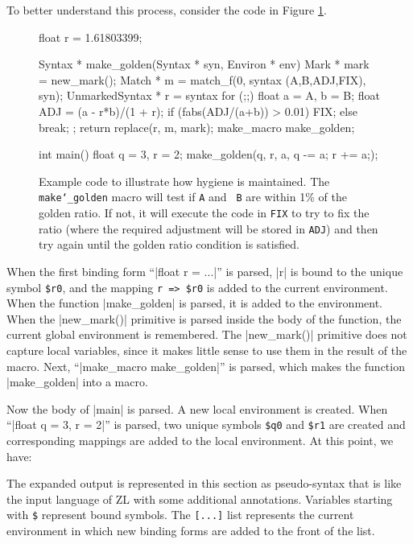 To better understand this process, consider the code in Figure
\ref{hygiene-fig}.  
\begin{figure}
\begin{codef}
float r = 1.61803399;

Syntax * make_golden(Syntax * syn, Environ * env) { 
  Mark * mark = new_mark(); 
  Match * m = match_f(0, syntax (A,B,ADJ,FIX), syn); 
  UnmarkedSyntax * r = syntax { 
    for (;;) { float a = A, b = B; 
               float ADJ = (a - r*b)/(1 + r); 
               if (fabs(ADJ/(a+b)) > 0.01) FIX; 
               else break; } 
  }; 
  return replace(r, m, mark); 
} 
make_macro make_golden; 

int main() {
  float q = 3, r = 2;
  make_golden(q, r, a, {q -= a; r += a;});
}
\end{codef}
\caption[Example code to illustrate how hygiene is maintained.]%
{Example code to illustrate how hygiene is maintained.
  The {\tt make\char`\_golden} macro will test if {\tt A} and {\tt
    B} are within 1\% of the golden ratio.  If not, it will execute
  the code in {\tt FIX} to try to fix the ratio (where the required
  adjustment will be stored in {\tt ADJ}) and then try again until the 
  golden ratio condition is satisfied.}
\label{hygiene-fig}
\end{figure}
When the first binding form ``|float r = ...|'' is
parsed, |r| is bound to the unique symbol \verb/$r0/, and the mapping
\verb/r => $r0/ is added to the current environment.  When the
function |make_golden| is parsed, it is added to the environment.
When the |new_mark()| primitive is parsed inside the body of the
function, the current global environment is remembered.  The
|new_mark()| primitive does not capture local variables, since it
makes little sense to use them in the result of the macro.  Next,
``|make_macro make_golden|'' is parsed, which makes the function
|make_golden| into a macro.

Now the body of |main| is parsed.  A new local environment is
created.  When ``|float q = 3, r = 2|'' is parsed, two unique symbols
\verb/$q0/ and \verb/$r1/ are created and corresponding mappings are
added to the local environment.  At this point, we have:
The expanded output is represented in this section as
pseudo-syntax that is like the input language of ZL with some
additional annotations.  Variables starting with \verb/$/ represent bound
symbols.  The \verb/[...]/ list represents the current environment
in which new binding forms are added to the front of the list.

